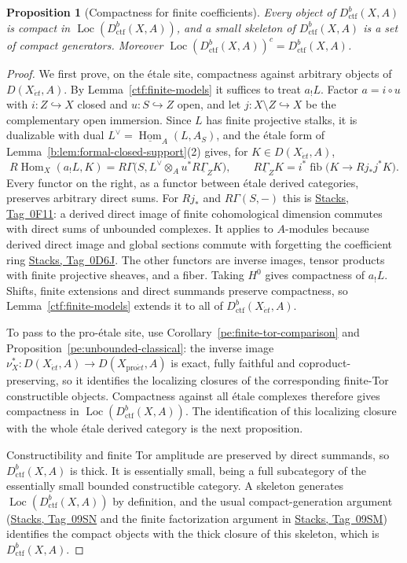 \documentclass[11pt,a4paper]{article}
\numberwithin{equation}{section}
\newtheorem{proposition}[theorem]{Proposition}
\theoremstyle{definition}
\theoremstyle{remark}
\newcommand{\RHom}{R\!\operatorname{Hom}}
\newcommand{\Loc}{\operatorname{Loc}}
\newcommand{\et}{\acute{e}t}
\newcommand{\proet}{\mathrm{pro}\acute{e}t}
\newcommand{\stacks}[1]{\href{https://stacks.math.columbia.edu/tag/#1}{\textnormal{Stacks, Tag~#1}}}
\newcommand{\Dctf}{D^b_{\mathrm{ctf}}}
\begin{document}
\begin{proposition}[Compactness for finite coefficients]
\label{ctf:finite-compact}
Every object of $\Dctf(X,A)$ is compact in $\Loc(\Dctf(X,A))$,
and a small skeleton of $\Dctf(X,A)$ is a set of compact generators.
Moreover $\Loc(\Dctf(X,A))^c=\Dctf(X,A)$.
\end{proposition}
\begin{proof}
We first prove, on the \'etale site, compactness against arbitrary
objects of $D(X_{\et},A)$. By Lemma~\ref{ctf:finite-models} it
suffices to treat $a_!L$. Factor $a=i\circ u$ with
$i:Z\hookrightarrow X$ closed and $u:S\hookrightarrow Z$ open, and let
$j:X\setminus Z\hookrightarrow X$ be the complementary open immersion.
Since $L$ has finite projective stalks, it is dualizable with dual
$L^\vee=\underline{\operatorname{Hom}}_A(L,A_S)$, and the \'etale form of
Lemma~\ref{b:lem:formal-closed-support}(2) gives, for $K\in D(X_{\et},A)$,
\[
 \RHom_X(a_!L,K)
 =R\Gamma\bigl(S,L^\vee\otimes_A u^*R\underline\Gamma_ZK\bigr),
 \qquad R\underline\Gamma_ZK=i^*\operatorname{fib}\bigl(K\to Rj_*j^*K\bigr).
\]
Every functor on the right, as a functor between \'etale derived
categories, preserves arbitrary direct sums. For $Rj_*$
and $R\Gamma(S,-)$ this is \stacks{0F11}: a derived direct image of
finite cohomological dimension commutes with direct sums of unbounded
complexes. It applies to $A$-modules because derived direct
image and global sections commute with forgetting the coefficient ring
\stacks{0D6J}. The other functors are inverse images, tensor products
with finite projective sheaves, and a fiber. Taking $H^0$ gives
compactness of $a_!L$. Shifts, finite extensions and direct summands
preserve compactness, so Lemma~\ref{ctf:finite-models} extends it to
all of $\Dctf(X_{\et},A)$.

To pass to the pro-\'etale site, use
Corollary~\ref{pe:finite-tor-comparison} and
Proposition~\ref{pe:unbounded-classical}: the inverse image
$\nu_X^*\colon D(X_{\et},A)\to D(X_{\proet},A)$ is exact, fully
faithful and coproduct-preserving, so it identifies the localizing
closures of the corresponding finite-Tor constructible objects.
Compactness against all \'etale complexes therefore gives compactness
in $\Loc(\Dctf(X,A))$. The identification of this localizing closure
with the whole \'etale derived category is the next proposition.

Constructibility and finite Tor amplitude are preserved by direct
summands, so $\Dctf(X,A)$ is thick. It is essentially small,
being a full subcategory of the essentially small bounded constructible
category. A skeleton generates $\Loc(\Dctf(X,A))$ by definition, and the
usual compact-generation argument (\stacks{09SN} and the finite
factorization argument in \stacks{09SM}) identifies the compact objects
with the thick closure of this skeleton, which is $\Dctf(X,A)$.
\end{proof}
\end{document}
